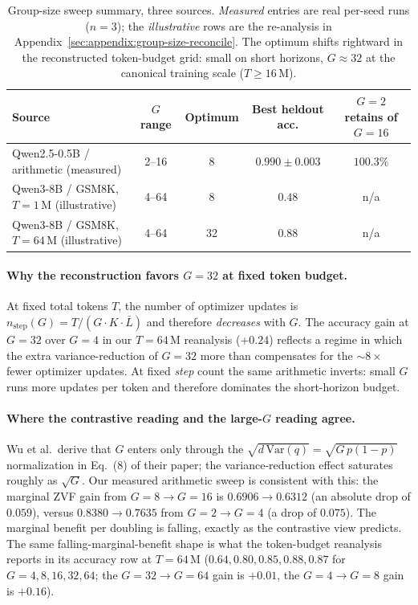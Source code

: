 \documentclass{article}
\begin{document}
\begin{table}[htbp]
\centering
\small
\begin{tabular}{lcccc}
\toprule
Source & $G$ range & Optimum & Best heldout acc. & $G{=}2$ retains of $G{=}16$ \\
\midrule
Qwen2.5-0.5B / arithmetic (measured) & 2--16 & 8 & $0.990 \pm 0.003$ & $100.3\%$ \\
Qwen3-8B / GSM8K, $T{=}1\,$M (illustrative)   & 4--64 & 8  & $0.48$ & n/a \\
Qwen3-8B / GSM8K, $T{=}64\,$M (illustrative) & 4--64 & 32 & $\mathbf{0.88}$ & n/a \\
\bottomrule
\end{tabular}
\caption{Group-size sweep summary, three sources. \emph{Measured} entries
are real per-seed runs ($n{=}3$); the \emph{illustrative} rows are the
re-analysis in Appendix~\ref{sec:appendix:group-size-reconcile}. The
optimum shifts rightward in the reconstructed token-budget grid: small on
short horizons, $G{\approx}32$ at the canonical training scale
($T{\ge}16\,$M).}
\label{tab:groupsize-summary}
\end{table}

\paragraph{Why the reconstruction favors $G{=}32$ at fixed token budget.}
At fixed total tokens $T$, the number of optimizer updates is
$n_\text{step}(G) = T / (G \cdot K \cdot \bar L)$ and therefore
\emph{decreases} with $G$. The accuracy gain at $G{=}32$ over $G{=}4$
in our $T{=}64\,$M reanalysis (+$0.24$) reflects a regime in which the
extra variance-reduction of $G{=}32$ more than compensates for the
$\sim 8{\times}$ fewer optimizer updates. At fixed \emph{step} count the
same arithmetic inverts: small $G$ runs more updates per token and
therefore dominates the short-horizon budget.

\paragraph{Where the contrastive reading and the large-$G$ reading agree.}
Wu et al.\ derive that $G$ enters only through the
$\sqrt{d\,\mathrm{Var}(q)} = \sqrt{G \, p(1{-}p)}$ normalization
in Eq.~(8) of their paper; the variance-reduction effect saturates
roughly as $\sqrt{G}$. Our measured arithmetic sweep is consistent with
this: the marginal ZVF gain from $G{=}8 \to G{=}16$ is
$0.6906 \to 0.6312$ (an absolute drop of $0.059$), versus
$0.8380 \to 0.7635$ from $G{=}2 \to G{=}4$ (a drop of $0.075$). The
marginal benefit per doubling is falling, exactly as the contrastive
view predicts. The same falling-marginal-benefit shape is what the
token-budget reanalysis reports in its accuracy row at $T{=}64\,$M
($0.64, 0.80, 0.85, 0.88, 0.87$ for $G{=}4, 8, 16, 32, 64$; the
$G{=}32 \to G{=}64$ gain is $+0.01$, the $G{=}4 \to G{=}8$ gain is
$+0.16$).
\end{document}
